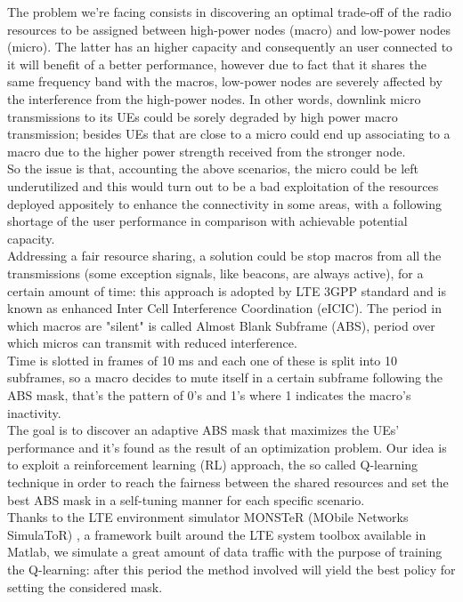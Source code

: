 \documentclass[conference,10pt]{IEEEtran}
\begin{document}
The problem we're facing consists in discovering an optimal trade-off of the radio resources to be assigned between high-power nodes (macro) and low-power nodes (micro). The latter has an higher capacity and consequently an user connected to it will benefit of a better performance, however due to fact that it shares the same frequency band with the macros, low-power nodes are severely affected by the interference from the high-power nodes. In other words, downlink micro transmissions to its UEs could be sorely degraded by high power macro transmission; besides UEs that are close to a micro could end up associating to a macro due to the higher power strength received from the stronger node.\\
So the issue is that, accounting the above scenarios, the micro could be left underutilized and this would turn out to be a bad exploitation of the resources deployed appositely to enhance the connectivity in some areas, with a following shortage of the user performance in comparison with achievable potential capacity.\\
Addressing a fair resource sharing, a solution could be stop macros from all the transmissions (some exception signals, like beacons, are always active), for a certain amount of time: this approach is adopted by LTE 3GPP standard and is known as enhanced Inter Cell Interference Coordination (eICIC). The period in which macros are "silent" is called Almost Blank Subframe (ABS), period over which micros can transmit with reduced interference.\\
Time is slotted in frames of 10 ms and each one of these is split into 10 subframes, so a macro decides to mute itself in a certain subframe following the ABS mask, that's the pattern of 0's and 1's where 1 indicates the macro's inactivity.\\
The goal is to discover an adaptive ABS mask that maximizes the UEs' performance and it's found as the result of an optimization problem. Our idea is to exploit a reinforcement learning (RL) approach, the so called Q-learning technique in order to reach the fairness between the shared resources and set the best ABS mask in a self-tuning manner for each specific scenario.\\
Thanks to the LTE environment simulator MONSTeR (MObile Networks SimulaToR) \cite{monster}, a framework built around the LTE system toolbox available in Matlab, we simulate a great amount of data traffic with the purpose of training the Q-learning: after this period the method involved will yield the best policy for setting the considered mask.
\end{document}
